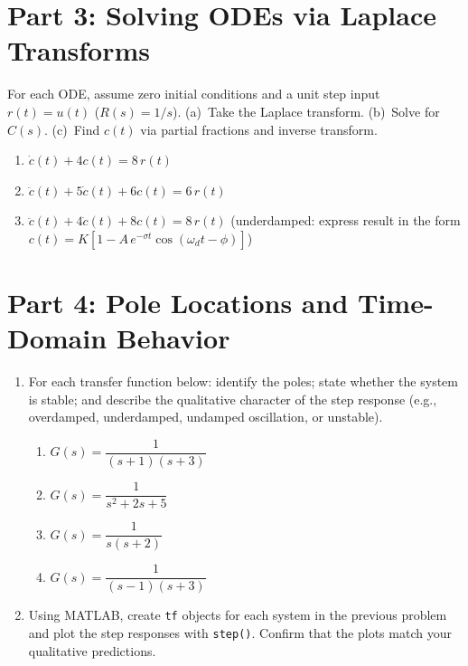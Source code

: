 \documentclass[11pt]{article}
\begin{document}
\section*{Part 3: Solving ODEs via Laplace Transforms}

For each ODE, assume zero initial conditions and a unit step input $r(t) = u(t)$
($R(s) = 1/s$).
(a)~Take the Laplace transform.
(b)~Solve for $C(s)$.
(c)~Find $c(t)$ via partial fractions and inverse transform.

\begin{enumerate}[resume]

\item $\dot{c}(t) + 4c(t) = 8\,r(t)$

\item $\ddot{c}(t) + 5\dot{c}(t) + 6c(t) = 6\,r(t)$

\item $\ddot{c}(t) + 4\dot{c}(t) + 8c(t) = 8\,r(t)$
  \hfill (underdamped: express result in the form
  $c(t) = K[1 - A\,e^{-\sigma t}\cos(\omega_d t - \phi)]$)

\end{enumerate}

\section*{Part 4: Pole Locations and Time-Domain Behavior}

\begin{enumerate}[resume]

\item For each transfer function below: identify the poles; state whether the
  system is stable; and describe the qualitative character of the step response
  (e.g., overdamped, underdamped, undamped oscillation, or unstable).

  \begin{enumerate}
    \item $G(s) = \dfrac{1}{(s+1)(s+3)}$
    \item $G(s) = \dfrac{1}{s^2 + 2s + 5}$
    \item $G(s) = \dfrac{1}{s(s+2)}$
    \item $G(s) = \dfrac{1}{(s-1)(s+3)}$
  \end{enumerate}

\item Using MATLAB, create \texttt{tf} objects for each system in the previous
  problem and plot the step responses with \texttt{step()}.
  Confirm that the plots match your qualitative predictions.

\end{enumerate}
\end{document}
